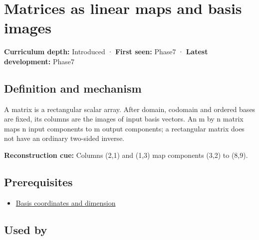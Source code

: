 \hypertarget{appendix-bd39c3bf5d64}{}
\section{Matrices as linear maps and basis images}\label{appendix-bd39c3bf5d64-matrices-as-linear-maps-and-basis-images}

\textbf{Curriculum depth:} Introduced · \textbf{First seen:} Phase7 · \textbf{Latest development:} Phase7

\subsection{Definition and mechanism}\label{appendix-bd39c3bf5d64-definition-and-mechanism}

A matrix is a rectangular scalar array. After domain, codomain and ordered bases are fixed, its columns are the images of input basis vectors. An m by n matrix maps n input components to m output components; a rectangular matrix does not have an ordinary two-sided inverse.

\textbf{Reconstruction cue:} Columns (2,1) and (1,3) map components (3,2) to (8,9).

\subsection{Prerequisites}\label{appendix-bd39c3bf5d64-prerequisites}

\begin{itemize}
\tightlist
\item
  \hyperref[appendix-ce0341f7ea0d]{Basis coordinates and dimension}
\end{itemize}

\subsection{Used by}\label{appendix-bd39c3bf5d64-used-by}

